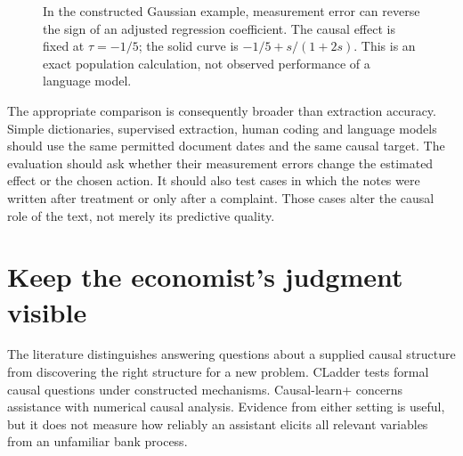 \begin{figure}[htbp]\centering
{}
\caption{In the constructed Gaussian example, measurement error can reverse
the sign of an adjusted regression coefficient. The causal effect is fixed at
$\tau=-1/5$; the solid curve is $-1/5+s/(1+2s)$. This is an exact population
calculation, not observed performance of a language model.}
\label{reading:measurement-error}
\end{figure}

The appropriate comparison is consequently broader than extraction accuracy.
Simple dictionaries, supervised extraction, human coding and language models
should use the same permitted document dates and the same causal target.
The evaluation should ask whether their measurement errors change the estimated
effect or the chosen action. It should also test cases in which the notes were
written after treatment or only after a complaint. Those cases alter the
causal role of the text, not merely its predictive quality.
\citep{exec13_census_text_review_arxiv}

\section{Keep the economist's judgment visible}

The literature distinguishes answering questions about a supplied causal
structure from discovering the right structure for a new problem. CLadder
tests formal causal questions under constructed mechanisms. Causal-learn+
concerns assistance with numerical causal analysis. Evidence from either
setting is useful, but it does not measure how reliably an assistant elicits
all relevant variables from an unfamiliar bank process.
\citep{v12_la_2312_04350,v12_la_2606_23608}

